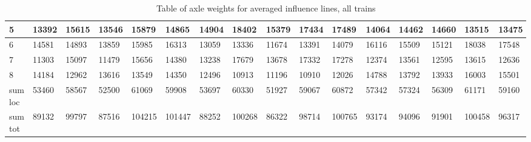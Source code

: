 \begin{table}[h]
\begin{adjustbox}{center}
\begin{tabularx}{\pagewidth}{ |X|X|X|X|X|X|X|X|X|X|X|X|X|X|X|X| }
      \hline
      5 & 13392   &   15615   &    13546   &    15879   &    14865    &   14904  &     18402    &   15379   &    17434   &    17489   &    14064   &    14462    &   14660   &   13515    &    13475  \\
      \hline
      6 & 14581   &   14893   &    13859   &    15985   &    16313    &   13059  &     13336    &   11674   &    13391   &    14079   &    16116   &    15509    &   15121   &   18038    &    17548  \\
      \hline
      7 & 11303   &   15097   &    11479   &    15656   &    14380    &   13238  &     17679    &   13678   &    17332   &    17278   &    12374   &    13561    &   12595   &   13615    &    12636  \\
      \hline
      8 & 14184   &   12962   &    13616   &    13549   &    14350    &   12496  &     10913    &   11196   &    10910   &    12026   &    14788   &    13792    &   13933   &   16003    &    15501  \\
      \hline
      sum loc & 53460   &   58567   &    52500   &    61069   &    59908    &   53697  &     60330    &   51927   &    59067   &    60872   &    57342   &    57324    &   56309   &   61171    &    59160  \\
      \hline
      sum tot & 89132 & 99797 & 87516 & 104215 & 101447 & 88252 & 100268 & 86322 & 98714 & 100765 & 93174 & 94096 & 91901 & 100458 & 96317  \\
      \hline
    \end{tabularx}
  \end{adjustbox}
  \caption{Table of axle weights for averaged influence lines, all trains}
  \label{table:all_trains_all sensors}
\end{table}

